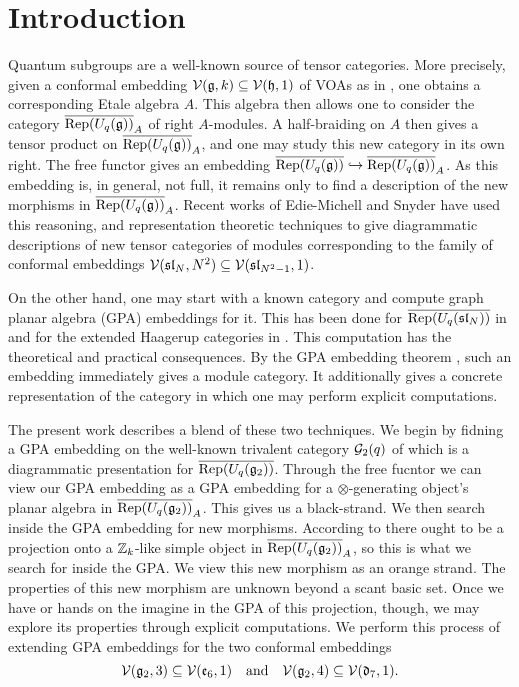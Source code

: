 \section{Introduction}
Quantum subgroups are a well-known source of tensor categories.
More precisely, given a conformal embedding $\mathcal{V}(\mathfrak{g},k) \subseteq \mathcal{V}(\mathfrak{h},1)$ of VOAs 
as in \cite{DMNO}, one obtains a corresponding Etale algebra $A$.
This algebra then allows one to consider the category $\overline{\operatorname{Rep}(U_q(\mathfrak{g}))}_A$ of right $A$-modules.
A half-braiding on $A$ then gives a tensor product on $\overline{\operatorname{Rep}(U_q(\mathfrak{g}))}_A$, and one may study this
new category in its own right.
The free functor gives an embedding $\overline{\operatorname{Rep}(U_q(\mathfrak{g}))} \hookrightarrow \overline{\operatorname{Rep}(U_q(\mathfrak{g}))}_A$.
As this embedding is, in general, not full, it remains only to 
find a description of the new morphisms in $\overline{\operatorname{Rep}(U_q(\mathfrak{g}))}_A$.
Recent works of Edie-Michell and Snyder \cite{cain_noah} have used this reasoning, and 
representation theoretic techniques to give diagrammatic descriptions of new tensor categories of modules
corresponding to the family of conformal embeddings $\mathcal{V}(\mathfrak{sl}_N,N^2) \subseteq \mathcal{V}(\mathfrak{sl}_{N^2-1},1)$.

On the other hand, one may start with a known category and compute graph planar algebra (GPA) embeddings for it.
This has been done for $\overline{\operatorname{Rep}(U_q(\mathfrak{sl}_N))}$ in \cite{Cain_Dan} and for the 
extended Haagerup categories in \cite{extended_haagerup}.
This computation has the theoretical and practical consequences.
By the GPA embedding theorem \cite{something}, such an embedding immediately gives a module category.
It additionally gives a concrete representation of the category in which one may perform explicit computations.

The present work describes a blend of these two techniques.
We begin by fidning a GPA embedding on the well-known trivalent category $\mathcal{G}_2(q)$ of \cite{Kuperberg,tricats}
which is a diagrammatic presentation for $\overline{\operatorname{Rep}(U_q(\mathfrak{g}_2))}$.
Through the free fucntor we can view our GPA embedding as a GPA embedding for a $\otimes$-generating 
object's planar algebra in $\overline{\operatorname{Rep}(U_q(\mathfrak{g}_2))}_A$.
This gives us a black-strand.
We then search inside the GPA embedding for new morphisms.
According to \cite{DMNO} there ought to be a projection onto a $\mathbb{Z}_k$-like simple object in $\overline{\operatorname{Rep}(U_q(\mathfrak{g}_2))}_A$,
so this is what we search for inside the GPA.
We view this new morphism as an orange strand.
The properties of this new morphism are unknown beyond a scant basic set.
Once we have or hands on the imagine in the GPA of this projection, though, 
we may explore its properties through explicit computations.
We perform this process of extending GPA embeddings for the two conformal embeddings
\begin{equation}\label{eq:conf-embs}
    \mathcal{V}(\mathfrak{g}_2,3) \subseteq \mathcal{V}(\mathfrak{e}_6,1) \quad\text{and}\quad \mathcal{V}(\mathfrak{g}_2,4) \subseteq \mathcal{V}(\mathfrak{d}_7,1).
\end{equation}


